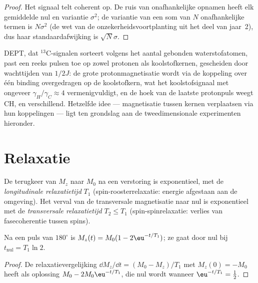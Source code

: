\begin{proof}
Het signaal telt coherent op. De ruis van onafhankelijke opnamen heeft
elk gemiddelde nul en variantie $\sigma^2$; de variantie van een som van
$N$ onafhankelijke termen is
$N\sigma^2$ (de wet van de onzekerheidsvoortplanting uit het deel van
jaar~2), dus haar standaardafwijking
is $\sqrt N\sigma$.
\end{proof}

DEPT, dat ${}^{13}$C-signalen sorteert volgens het aantal gebonden
waterstofatomen, past een reeks pulsen toe op zowel protonen als
koolstofkernen, gescheiden door wachttijden van $1/2J$: de grote
protonmagnetisatie wordt via de koppeling over één binding overgedragen
op de koolstofkern, wat het koolstofsignaal met ongeveer
$\gamma_H/\gamma_C \approx 4$ vermenigvuldigt, en de hoek van de laatste
protonpuls weegt CH,  en
 verschillend. Hetzelfde idee --- magnetisatie tussen kernen
verplaatsen via hun koppelingen --- ligt ten grondslag aan de
tweedimensionale experimenten hieronder.

\section{Relaxatie}

\begin{definition}\label{def:b3:advanced-nmr:relaxation}
De terugkeer van $M_z$ naar $M_0$ na een verstoring is exponentieel, met de
\emph{longitudinale relaxatietijd} $T_1$
(spin-roosterrelaxatie: energie afgestaan aan de omgeving). Het verval van
de transversale magnetisatie naar nul is exponentieel met de
\emph{transversale relaxatietijd} $T_2 \le T_1$
(spin-spinrelaxatie: verlies van fasecoherentie tussen spins).
\end{definition}

\begin{proposition}[Inversieherstel]\label{prop:b3:advanced-nmr:inversion-recovery}
Na een puls van $180^\circ$ is $M_z(t) = M_0(1 - 2\eu^{-t/T_1})$; ze gaat door
nul bij
$t_{\mathrm{nul}} = T_1\ln2$.
\end{proposition}

\begin{proof}
De relaxatievergelijking $\dd M_z/\dd t = (M_0 - M_z)/T_1$ met $M_z(0) = -M_0$ heeft
als oplossing $M_0 - 2M_0\eu^{-t/T_1}$, die nul wordt wanneer $\eu^{-t/T_1} = \frac12$.
\end{proof}

